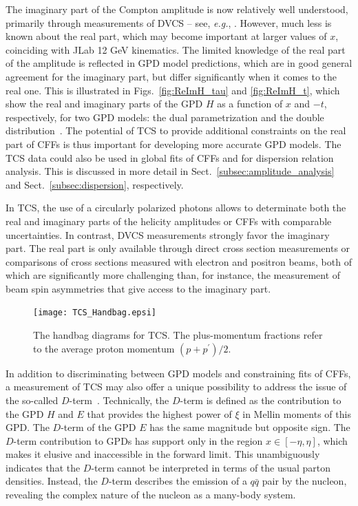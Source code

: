The imaginary part of the Compton amplitude is now relatively well understood,
primarily through measurements of DVCS -- see, \textit{e.g.},
\cite{Guidal:2013rya}. However, much less is known about
the real part, which may become important at larger values of $x$, coinciding
with JLab 12 GeV kinematics.
The limited knowledge of the real part of the amplitude is reflected in GPD
model predictions, which are in good general agreement for the imaginary part,
but differ significantly when it comes to the real one. This is illustrated
in Figs.~\ref{fig:ReImH_tau} and \ref{fig:ReImH_t}, which show the real and
imaginary parts of the GPD $H$ as a function of $x$ and $-t$, respectively,
for two GPD models: the dual parametrization
\cite{Polyakov:2002wz,Guzey:2006xi,Guzey:2008ys,Polyakov:2008aa} and the
double distribution~\cite{Radyushkin:1998es}.
The potential of TCS to provide additional constraints on the real part
of CFFs is thus important for developing more accurate GPD models. The
TCS data could also be used in global fits of CFFs and for dispersion
relation analysis. This is discussed in more detail in
Sect.~\ref{subsec:amplitude_analysis} and
Sect.~\ref{subsec:dispersion}, respectively.

In TCS, the use of a circularly polarized photons allows to determinate
both the real and imaginary parts of the helicity amplitudes or CFFs
with comparable uncertainties. In contrast, DVCS measurements strongly
favor the imaginary part. The real part is only available through direct
cross section measurements or comparisons of cross sections measured
with electron and positron beams, both of which are significantly more
challenging than, for instance, the measurement of beam spin asymmetries
that give access to the imaginary part.

\begin{figure}[t]
\begin{center}
\texttt{[image: TCS\_Handbag.epsi]}
\caption{\small{The handbag diagrams for TCS. The plus-momentum fractions
refer to the average proton momentum $(p+p^{\prime})/2$.}}
\label{fig:TCS_Handbag}
\end{center}
\end{figure}

In addition to discriminating between GPD models and constraining fits of
CFFs, a measurement of TCS may also offer a unique possibility to address
the issue of the so-called $D$-term~\cite{Polyakov:1999gs}.
Technically, the $D$-term is defined as the contribution to the GPD $H$ and
$E$ that provides the highest power of $\xi$ in Mellin moments of this GPD.
The $D$-term of the GPD $E$ has the same magnitude but opposite sign.
The $D$-term contribution to GPDs has support only in the region
$x \in [-\eta,\eta]$, which makes it elusive and inaccessible in the forward
limit. This unambiguously indicates that the $D$-term cannot be interpreted
in terms of the usual parton densities. Instead, the $D$-term describes the
emission of a $q {\bar q}$ pair by the nucleon, revealing the complex nature 
of the nucleon as a many-body system.

